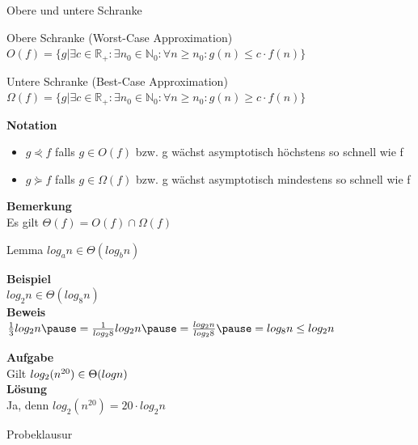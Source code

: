\begin{frame}{Obere und untere Schranke}
	\begin{block}{Obere Schranke (Worst-Case Approximation)}
		$O(f) = \{g| \exists c \in \mathbb{R}_+ : \exists n_0 \in \mathbb{N}_0: \forall n \geq n_0 : g(n)\leq c \cdot f(n)\}$
	\end{block}

	\pause
	
	\begin{block}{Untere Schranke (Best-Case Approximation)}
		$\Omega(f) = \{g| \exists c \in \mathbb{R}_+ : \exists n_0 \in \mathbb{N}_0: \forall n \geq n_0 : g(n)\geq c \cdot f(n)\}$
	\end{block}
	\pause
	\textbf{Notation}\\
	\begin{itemize}
		\item $g\curlyeqprec f$ falls $g \in O(f)$ bzw. g wächst asymptotisch höchstens so schnell wie f
		\item $g \curlyeqsucc f $ falls $g \in \Omega (f)$ bzw. g wächst asymptotisch mindestens so schnell wie f
	\end{itemize}
	\pause
	\textbf{Bemerkung}\\
	Es gilt $\Theta (f) = O(f) \cap \Omega (f)$
\end{frame}

\begin{frame}
	\begin{block}{Lemma}
		$log_a n \in \Theta (log_b n)$
	\end{block}
	\textbf{Beispiel}\\
	$log_2 n \in \Theta(log_8 n)$\\
	\pause
	\textbf{Beweis}\\
	$\frac{1}{3} log_2 n \ip= \frac{1}{log_2 8} log_2 n \ip= \frac{log_2 n}{log_2 8} \ip= log_8 n \leq log_2 n$
\end{frame}

\begin{frame}
	\textbf{Aufgabe}\\
	Gilt $log_2(n^{20}) \in \Theta (log \space n)$\\
	\pause
	\textbf{Lösung}\\
	Ja, denn $log_2 (n^{20}) = 20 \cdot log_2 n$
\end{frame}

\begin{frame}
	Probeklausur
\end{frame}

